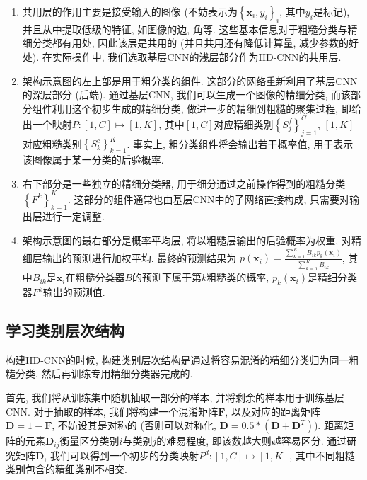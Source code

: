 \documentclass[lang=cn, 11pt,   a4paper]{elegantpaper}
\begin{document}
\begin{enumerate}
	\item 共用层的作用主要是接受输入的图像 (不妨表示为$\left\{\mathbf{x}_{i}, y_{i}\right\}_{i}$, 其中$y_i$是标记), 并且从中提取低级的特征, 如图像的边, 角等. 这些基本信息对于粗糙分类与精细分类都有用处, 因此该层是共用的 (并且共用还有降低计算量, 减少参数的好处). 在实际操作中, 我们选取基层CNN的浅层部分作为HD-CNN的共用层.
	\item 架构示意图的左上部是用于粗分类的组件. 这部分的网络重新利用了基层CNN的深层部分 (后端). 通过基层CNN, 我们可以生成一个图像的精细分类, 而该部分组件利用这个初步生成的精细分类, 做进一步的精细到粗糙的聚集过程, 即给出一个映射$P: [1, C] \mapsto[1, K]$, 其中$[1, C]$对应精细类别$\left\{S_{j}^{f}\right\}_{j=1}^{C}$, $[1, K]$对应粗糙类别$\left\{S_{k}^{c}\right\}_{k=1}^{K}$. 事实上, 粗分类组件将会输出若干概率值, 用于表示该图像属于某一分类的后验概率.
	\item 右下部分是一些独立的精细分类器, 用于细分通过之前操作得到的粗糙分类$\left\{F^{k}\right\}_{k=1}^{K}$. 这部分的组件通常也由基层CNN中的子网络直接构成, 只需要对输出层进行一定调整.
	\item 架构示意图的最右部分是概率平均层, 将以粗糙层输出的后验概率为权重, 对精细层输出的预测进行加权平均. 最终的预测结果为 $p\left (\mathbf{x}_{i}\right)=\frac{\sum_{k=1}^{K} B_{i k} p_{k}\left (\mathbf{x}_{i}\right)}{\sum_{k=1}^{K} B_{i k}}$, 其中$B_{i k}$是$\mathbf{x}_i$在粗糙分类器$B$的预测下属于第$k$粗糙类的概率, $p_{k}\left (\mathbf{x}_{i}\right)$是精细分类器$F^k$输出的预测值.
\end{enumerate}

\subsection{学习类别层次结构}
构建HD-CNN的时候, 构建类别层次结构是通过将容易混淆的精细分类归为同一粗糙分类, 然后再训练专用精细分类器完成的.

首先, 我们将从训练集中随机抽取一部分的样本, 并将剩余的样本用于训练基层CNN. 对于抽取的样本, 我们将构建一个混淆矩阵$\mathbf{F}$, 以及对应的距离矩阵$\mathbf{D}=1-\mathbf{F}$, 不妨设其是对称的 (否则可以对称化, $\mathbf{D}=0.5 *\left (\mathbf{D}+\mathbf{D}^{T}\right)$). 距离矩阵的元素$\mathbf{D}_{i j}$衡量区分类别$i$与类别$j$的难易程度, 即该数越大则越容易区分. 通过研究矩阵$\mathbf{D}$, 我们可以得到一个初步的分类映射$P^{d}: [1, C] \mapsto[1, K]$, 其中不同粗糙类别包含的精细类别不相交.
\end{document}
